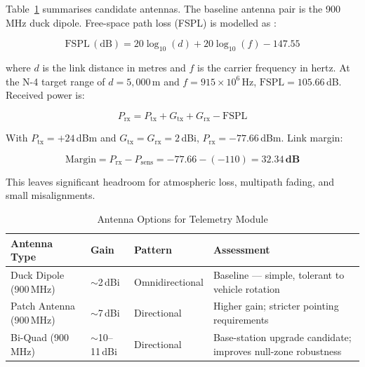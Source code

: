 Table~\ref{tab:antenna_compare_method} summarises candidate antennas. The baseline
antenna pair is the 900\,MHz duck dipole. Free-space path loss (FSPL) is
modelled as \cite{xbee_manual,arrl_antenna_book}:

\begin{equation}
  \mathrm{FSPL}\,(\mathrm{dB}) = 20\log_{10}(d) + 20\log_{10}(f) - 147.55
  \label{eq:fspl}
\end{equation}

where $d$ is the link distance in metres and $f$ is the carrier frequency in
hertz. At the N-4 target range of $d = 5{,}000$\,m and $f = 915 \times 10^6$\,Hz,
$\mathrm{FSPL} = 105.66$\,dB. Received power is:

\begin{equation}
  P_\mathrm{rx} = P_\mathrm{tx} + G_\mathrm{tx} + G_\mathrm{rx} - \mathrm{FSPL}
  \label{eq:link_budget}
\end{equation}

With $P_\mathrm{tx} = +24$\,dBm and $G_\mathrm{tx} = G_\mathrm{rx} = 2$\,dBi,
$P_\mathrm{rx} = -77.66$\,dBm. Link margin:

\begin{equation}
  \mathrm{Margin} = P_\mathrm{rx} - P_\mathrm{sens} = -77.66 - (-110) = \mathbf{32.34\,dB}
  \label{eq:link_margin}
\end{equation}

This leaves significant headroom for atmospheric loss, multipath fading, and
small misalignments.

\begin{table}[!htbp]
  \centering
  \caption{Antenna Options for Telemetry Module}
  \label{tab:antenna_compare_method}
  \small
  \renewcommand{\arraystretch}{1.2}
  \begin{tabular}{@{}p{3.5cm}|p{2cm}|p{2.5cm}|p{5.5cm}@{}}
    \toprule
    \rowcolor{gray!22}\textbf{Antenna Type} & \textbf{Gain} & \textbf{Pattern} & \textbf{Assessment} \\ \midrule
    Duck Dipole (900\,MHz) & $\sim$2\,dBi & Omnidirectional & Baseline --- simple, tolerant to vehicle rotation \\
    Patch Antenna (900\,MHz) & $\sim$7\,dBi & Directional & Higher gain; stricter pointing requirements \\
    Bi-Quad (900\,MHz) & $\sim$10--11\,dBi & Directional & Base-station upgrade candidate; improves null-zone robustness \\ \bottomrule
  \end{tabular}
\end{table}


